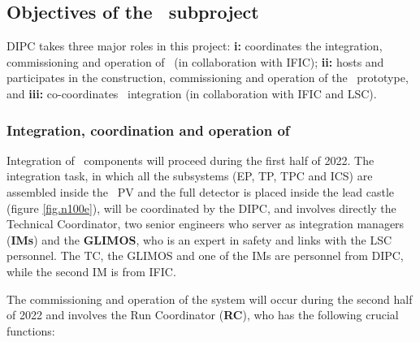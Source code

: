 \subsection{Objectives of the \sDIPC\ subproject}
\label{sec.obj.dipc}

DIPC takes three major roles in this project: {\bf i:} coordinates the integration, commissioning and operation of \Next\ (in collaboration with IFIC); 
{\bf ii:} hosts and participates in the construction, commissioning and operation of the \HDEMO\ prototype, and 
{\bf iii:} co-coordinates \NHD\ integration (in collaboration with IFIC and LSC). 

   
\subsubsection*{Integration, coordination and operation of \Next}

\indent

%

Integration of \Next\ components will proceed during the first half of 2022. The integration task, in which all the subsystems (EP, TP, TPC and ICS) are assembled inside the \Next\ PV and the full detector is placed inside the lead castle (figure \ref{fig.n100e}), will be coordinated by the DIPC, and involves directly the Technical Coordinator, two senior engineers who server as integration managers ({\bf IMs}) and the {\bf GLIMOS}, who is an expert in safety and links with the LSC personnel. The TC, the GLIMOS and one of the IMs are personnel from DIPC, while the second IM is from IFIC. 

The commissioning and operation of the system will occur during the second half of 2022 and involves the Run Coordinator ({\bf RC}), who has the following crucial functions: 


\indent

